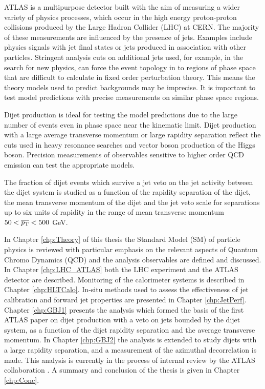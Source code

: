 ATLAS is a multipurpose detector built with the aim of measuring a wider variety of physics processes, which occur in the high energy proton-proton collisions produced by the Large Hadron Collider (LHC) at CERN.
The majority of these measurements are influenced by the presence of jets.
Examples include physics signals with jet final states or jets produced in association with other particles.
Stringent analysis cuts on additional jets used, for example, in the search for new physics, can force the event topology in to regions of phase space that are difficult to calculate in fixed order perturbation theory.
This means the theory models used to predict backgrounds may be imprecise.
It is important to test model predictions with precise measurements on similar phase space regions.

Dijet production is ideal for testing the model predictions due to the large number of events even in phase space near the kinematic limit. 
Dijet production with a large average transverse momentum or large rapidity separation reflect the cuts used in heavy resonance searches and vector boson production of the Higgs boson. 
Precision measurements of observables sensitive to higher order QCD emission can test the appropriate models.

The fraction of dijet events which survive a jet veto on the jet activity between the dijet system is studied as a function of the rapidity separation of the dijet, the mean transverse momentum of the dijet and the jet veto scale for separations up to six units of rapidity in the range of mean transverse momentum $50<\mbox{$\overline{p_{\rm T}}$}{}<500$ GeV.

In Chapter \ref{chp:Theory} of this thesis the Standard Model (SM) of particle physics is reviewed with particular emphasis on the relevant aspects of Quantum Chromo Dynamics (QCD) and the analysis observables are defined and discussed. 
In Chapter \ref{chp:LHC_ATLAS} both the LHC experiment and the ATLAS detector are described. 
Monitoring of the calorimeter systems is described in Chapter \ref{chp:HLTCalo}.
In-situ methods used to assess the effectiveness of jet calibration and forward jet properties are presented in Chapter \ref{chp:JetPerf}.
Chapter \ref{chp:GBJ1} presents the analysis which formed the basis of the first ATLAS paper \cite{ref:ATLASGap} on dijet production with a veto on jets bounded by the dijet system, as a function of the dijet rapidity separation and the average transverse momentum. 
In Chapter \ref{chp:GBJ2} the analysis is extended to study dijets with a large rapidity separation, and a measurement of the azimuthal decorrelation is made.
This analysis is currently in the process of internal review by the ATLAS collaboration \cite{ref:GBJInternal}.
A summary and conclusion of the thesis is given in Chapter \ref{chp:Conc}.


